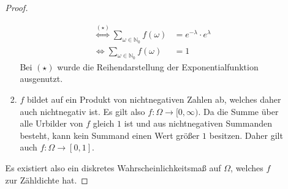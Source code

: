 \documentclass[a4paper]{scrartcl}
\newcommand{\gdw}{\Leftrightarrow}
\begin{document}
\begin{enumerate}[label=\bfseries\arabic*.]
\begin{enumerate}[label=(\alph*)]
\begin{proof}
\begin{enumerate}
\begin{equation*}
\begin{split}
                                    \stackrel{(\star)}{\gdw}
                                    \sum_{\omega \in \mathbb{N}_0} f(\omega)
                                    &= e^{-\lambda} \cdot e^\lambda \\
                                    \gdw
                                    \sum_{\omega \in \mathbb{N}_0} f(\omega)
                                    &= 1
                                \end{split}
                            \end{equation*}
                            Bei $(\star)$ wurde die Reihendarstellung der
                            Exponentialfunktion ausgenutzt.

                        \item
                            $f$ bildet auf ein Produkt von nichtnegativen Zahlen
                            ab, welches daher auch nichtnegativ ist.
                            Es gilt also $f\colon \Omega \to [0, \infty)$.
                            Da die Summe über alle Urbilder von $f$ gleich $1$
                            ist und aus nichtnegativen Summanden besteht, kann
                            kein Summand einen Wert größer $1$ besitzen.
                            Daher gilt auch $f\colon \Omega \to [0,1]$.

                    \end{enumerate}
                    Es existiert also ein diskretes Wahrscheinlichkeitsmaß auf
                    $\Omega$, welches $f$ zur Zähldichte hat.
                \end{proof}


\end{enumerate}
\end{enumerate}
\end{document}
